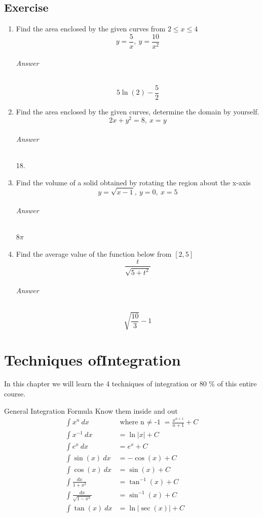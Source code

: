 \documentclass[letterpaper,10pt,twoside,twocolumn,openany]{book}
\begin{document}
\section{Exercise}
\begin{enumerate}
    \item Find the area enclosed by the given curves from $ 2 \leq x \leq 4 $ \[ y  =\frac{5}{x},\ y = \frac{10}{x^2} \] \subparagraph{Answer} \[5\ln(2)-\frac{5}{2}\]
    \item Find the area enclosed by the given curves, determine the domain by yourself. \[2x + y^2 = 8,\ x = y \] \subparagraph{Answer} 18.
    \item Find the volume of a solid obtained by rotating the region about the x-axis \[y = \sqrt{x - 1},\ y = 0 ,\ x = 5\] \subparagraph{Answer} $8\pi$
    \item Find the average value of the function below from $ [2, 5] $\[ \frac{t}{\sqrt{5 + t^2}}\] \subparagraph{Answer} \[\sqrt{\frac{10}{3}}-1\]
\end{enumerate}


\chapter{Techniques of\newline Integration}
In this chapter we will learn the 4 techniques of integration or 80 \% of this entire course.
\begin{DndSidebar}[]{General Integration Formula}
    Know them inside and out
    \begin{align}
        \int x^n\ dx\ &\text{where n $\neq$ -1} = \frac{x^{n+1}}{n+1} + C\\
        \int x^{-1}\ dx &= \ln|x| + C\\
        \int e^x\ dx &= e^x + C\\
        \int \sin(x)\ dx &= -\cos(x) + C\\
        \int \cos(x)\ dx &= \sin(x) + C\\
        \int \frac{dx}{1+x^2} &= \tan^{-1} (x) + C\\
        \int \frac{dx}{\sqrt{1-x^2}} &= \sin^{-1} (x) + C\\
        \int \tan(x)\ dx &= \ln|\sec(x)| + C  
    \end{align} 
\end{DndSidebar}
\end{document}
